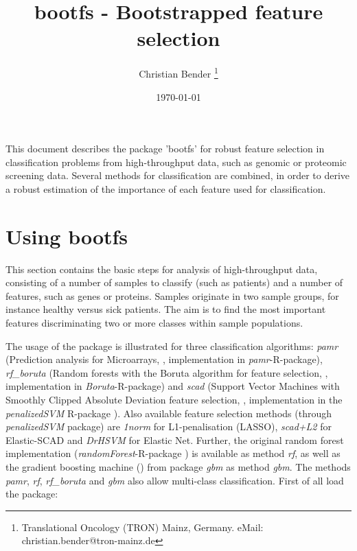 \documentclass[11pt,a4paper]{article}
\begin{document}
\title{bootfs - Bootstrapped feature selection}
\author{ Christian Bender \footnote{Translational Oncology (TRON) Mainz, Germany. eMail: christian.bender@tron-mainz.de} }
\date{\today}
\maketitle



This document describes the package 'bootfs' for robust feature selection in classification problems from high-throughput data, such as genomic or proteomic screening data. Several methods for classification are combined, in order to derive a robust estimation of the importance of each feature used for classification.

\section{Using bootfs}
\label{sec:quickstart}

This section contains the basic steps for analysis of high-throughput data, consisting of a number of samples to classify (such as patients) and a number of features, such as genes or proteins. Samples originate in two sample groups, for instance healthy versus sick patients. The aim is to find the most important features discriminating two or more classes within sample populations.

The usage of the package is illustrated for three classification algorithms: \emph{pamr} (Prediction analysis for Microarrays, \cite{Tibshirani2002}, implementation in \emph{pamr}-R-package), \emph{rf\_boruta} (Random forests with the Boruta algorithm for feature selection, \cite{Kursa2010}, implementation in \emph{Boruta}-R-package) and \emph{scad} (Support Vector Machines with Smoothly Clipped Absolute Deviation feature selection, \cite{Zhang2006}, implementation in the \emph{penalizedSVM} R-package \cite{Becker2011}). Also available feature selection methods (through \emph{penalizedSVM} package) are \emph{1norm} for L1-penalisation (LASSO), \emph{scad+L2} for Elastic-SCAD  and \emph{DrHSVM} for Elastic Net. Further, the original random forest implementation (\emph{randomForest}-R-package \cite{Breiman2001}) is available as method \emph{rf}, as well as the gradient boosting machine (\cite{Friedman2001,Friedman2002}) from package \emph{gbm} as method \emph{gbm}. The methods \emph{pamr}, \emph{rf}, \emph{rf\_boruta} and \emph{gbm} also allow multi-class classification. First of all load the package:
\end{document}
